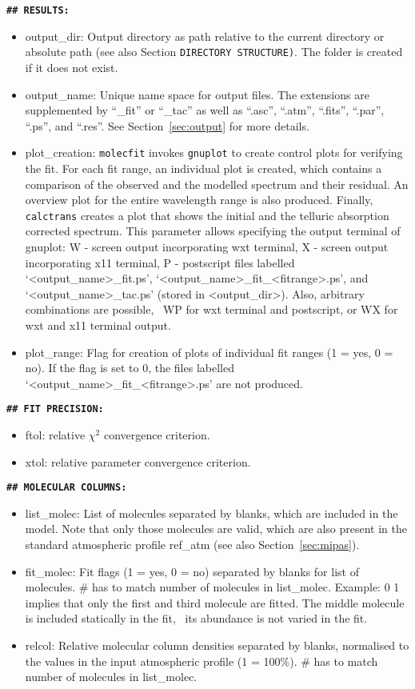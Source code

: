 {\bf\large\tt\#\# RESULTS:}
\begin{itemize}
\item {\sc output\_dir}: Output directory as path relative to the current directory or
absolute path (see also Section {\tt DIRECTORY STRUCTURE)}. The folder is
created if it does not exist.
\item {\sc output\_name}: Unique name space for output files. The extensions
are supplemented by ``\_fit'' or ``\_tac'' as well as ``.asc'', ``.atm'',
``.fits'', ``.par'', ``.ps'', and ``.res''. See Section~\ref{sec:output} for
more details.
\item {\sc plot\_creation}: {\tt molecfit} invokes {\tt gnuplot} to create
control plots for verifying the fit. For each fit range, an individual plot
is created, which contains a comparison of the observed and the modelled
spectrum and their residual. An overview plot for the entire wavelength range
is also produced. Finally, {\tt calctrans} creates a plot that shows the
initial and the telluric absorption corrected spectrum. This parameter allows
specifying the output terminal of gnuplot:
W - screen output incorporating wxt terminal,
X - screen output incorporating x11 terminal,
P - postscript files labelled `<output\_name>\_fit.ps',
    `<output\_name>\_fit\_<fitrange>.ps', and `<output\_name>\_tac.ps' (stored
    in <output\_dir>).
Also, arbitrary combinations are possible, \eg\ WP for wxt terminal and
postscript, or WX for wxt and x11 terminal output.
\item {\sc plot\_range}: Flag for creation of plots of individual fit ranges
(1 = yes, 0 = no). If the flag is set to 0, the files labelled
`<output\_name>\_fit\_<fitrange>.ps' are not produced.
\end{itemize}

{\bf\large\tt\#\# FIT PRECISION:}
\begin{itemize}
\item {\sc ftol}: relative $\chi^2$ convergence criterion.
\item {\sc xtol}: relative parameter convergence criterion.
\end{itemize}

{\bf\large\tt\#\# MOLECULAR COLUMNS:}
\begin{itemize}
\item {\sc list\_molec}: List of molecules separated by blanks, which are
included in the model. Note that only those molecules are valid, which are
also present in the standard atmospheric profile {\sc ref\_atm} (see also
Section~\ref{sec:mipas}).
\item {\sc fit\_molec}: Fit flags (1 = yes, 0 = no) separated by blanks for
list of molecules. \# has to match number of molecules in {\sc list\_molec}.
Example: { 0 1} implies that only the first and third molecule are
fitted. The middle molecule is included statically in the fit, \ie\ its
abundance is not varied in the fit.
\item {\sc relcol}: Relative molecular column densities separated by blanks,
normalised to the values in the input atmospheric profile (1 = 100\%). \# has
to match number of molecules in {\sc list\_molec}.
\end{itemize}


